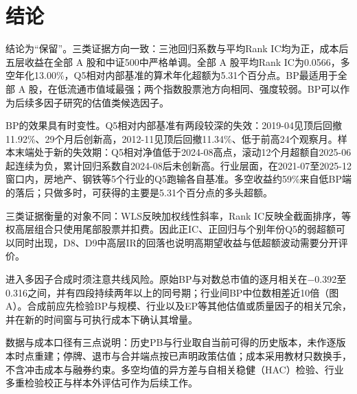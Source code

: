 \section{结论}
结论为“保留”。三类证据方向一致：三池回归系数与平均Rank IC均为正，成本后五层收益在全部 A 股和中证500中严格单调。全部 A 股平均Rank IC为0.0566，多空年化13.00\%，Q5相对内部基准的算术年化超额为5.31个百分点。BP最适用于全部 A 股，在低流通市值域最强；两个指数股票池方向相同、强度较弱。BP可以作为后续多因子研究的估值类候选因子。

BP的效果具有时变性。Q5相对内部基准有两段较深的失效：2019-04见顶后回撤11.92\%、29个月后创新高，2012-11见顶后回撤11.34\%、低于前高24个观察月。样本末端处于新的失效期：Q5相对净值低于2024-08高点，滚动12个月超额自2025-06起连续为负，累计回归系数自2024-08后未创新高。行业层面，在2021-07至2025-12窗口内，房地产、钢铁等5个行业的Q5跑输各自基准。多空收益约59\%来自低BP端的落后；只做多时，可获得的主要是5.31个百分点的多头超额。

三类证据衡量的对象不同：WLS反映加权线性斜率，Rank IC反映全截面排序，等权高层组合只使用尾部股票并扣费。因此正IC、正回归与个别年份Q5的弱超额可以同时出现，D8、D9中高层IR的回落也说明高期望收益与低超额波动需要分开评价。

进入多因子合成时须注意共线风险。原始BP与对数总市值的逐月相关在$-$0.392至0.316之间，并有四段持续两年以上的同号期；行业间BP中位数相差近10倍（图A）。合成前应先检验BP与规模、行业以及EP等其他估值或质量因子的相关冗余，并在新的时间窗与可执行成本下确认其增量。

数据与成本口径有三点说明：历史PB与行业取自当前可得的历史版本，未作逐版本时点重建；停牌、退市与合并端点按已声明政策估值；成本采用教材只数换手，不含冲击成本与融券约束。多空均值的异方差与自相关稳健（HAC）检验、行业多重检验校正与样本外评估可作为后续工作。
